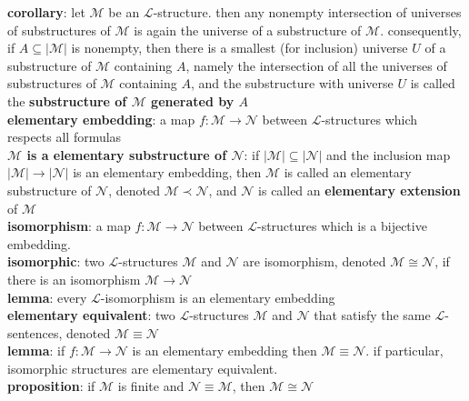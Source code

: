 \documentclass[a4paper]{article}
\newcommand\abs[1]{\ensuremath{\lvert#1\rvert}}
\begin{document}
\begin{framed}
	\noindent
	\textbf{corollary}: let $\mathscr{M}$ be an $\mathscr{L}$-structure. then any nonempty intersection of universes of substructures of $\mathscr{M}$ is again the universe of a substructure of $\mathscr{M}$. consequently, if $A \subseteq \abs{\mathscr{M}}$ is nonempty, then there is a smallest (for inclusion) universe $U$ of a substructure of $\mathscr{M}$ containing $A$, namely the intersection of all the universes of substructures of $\mathscr{M}$ containing $A$, and the substructure with universe $U$ is called the \textbf{substructure of $\mathscr{M}$ generated by $A$}\\
	
	\noindent
	\textbf{elementary embedding}: a map $f: \mathscr{M} \rightarrow \mathscr{N}$ between $\mathscr{L}$-structures which respects all formulas\\
	\textbf{$\mathscr{M}$ is a elementary substructure of $\mathscr{N}$}: if $\abs{\mathscr{M}} \subseteq \abs{\mathscr{N}}$ and the inclusion map $\abs{\mathscr{M}} \rightarrow \abs{\mathscr{N}}$ is an elementary embedding, then $\mathscr{M}$ is called an elementary substructure of $\mathscr{N}$, denoted $\mathscr{M} \prec \mathscr{N}$, and $\mathscr{N}$ is called an \textbf{elementary extension} of $\mathscr{M}$\\
	
	\noindent
	\textbf{isomorphism}: a map $f: \mathscr{M} \rightarrow \mathscr{N}$ between $\mathscr{L}$-structures which is a bijective embedding.\\
	\textbf{isomorphic}: two $\mathscr{L}$-structures $\mathscr{M}$ and $\mathscr{N}$ are isomorphism, denoted $\mathscr{M} \cong \mathscr{N}$, if there is an isomorphism $\mathscr{M} \rightarrow \mathscr{N}$\\
	\textbf{lemma}: every $\mathscr{L}$-isomorphism is an elementary embedding\\
	
	\noindent
	\textbf{elementary equivalent}: two $\mathscr{L}$-structures $\mathscr{M}$ and $\mathscr{N}$ that satisfy the same $\mathscr{L}$-sentences, denoted $\mathscr{M} \equiv \mathscr{N}$\\
	\textbf{lemma}: if $f: \mathscr{M} \rightarrow \mathscr{N}$ is an elementary embedding then $\mathscr{M} \equiv \mathscr{N}$. if particular, isomorphic structures are elementary equivalent.\\
	\textbf{proposition}: if $\mathscr{M}$ is finite and $\mathscr{N} \equiv \mathscr{M}$, then $\mathscr{M} \cong \mathscr{N}$\\
	

\end{framed}
\end{document}
